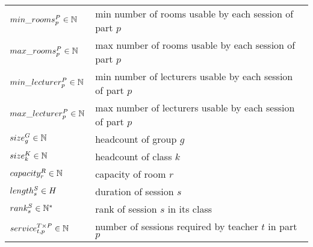 \begin{table}[!t]
\begin{center}
\begin{tabular}{|l|l|}
\hline
$min\_rooms^{P}_{p}\in{\mathbb{N}}$          &  min number of rooms usable by each session of part $p$
\\
$max\_rooms^{P}_{p}\in{\mathbb{N}}$          &  max number of rooms usable by each session of part $p$
\\
$min\_lecturer^{P}_{p}\in{\mathbb{N}}$  &  min number of lecturers usable by each session of part $p$
\\
$max\_lecturer^{P}_{p}\in{\mathbb{N}}$  &  max number of lecturers usable by each session of part $p$
\\
$size^{G}_{g}\in{\mathbb{N}}$               &  headcount of group $g$
\\
$size^{K}_{k}\in{\mathbb{N}}$            &  headcount of class $k$
\\
$capacity^{R}_{r}\in{\mathbb{N}}$             &  capacity of room $r$
\\
$length^{S}_{s}\in{H}$             &  duration of session $s$
\\
$rank^{S}_{s}\in{\mathbb{N}^*}$            &  rank of session $s$ in its class
\\
$service^{{T}\times{P}}_{t,p}\in{\mathbb{N}}$     &  number of sessions required by teacher $t$ in part $p$
\\\hline

\end{tabular}
\end{center}
\end{table}
